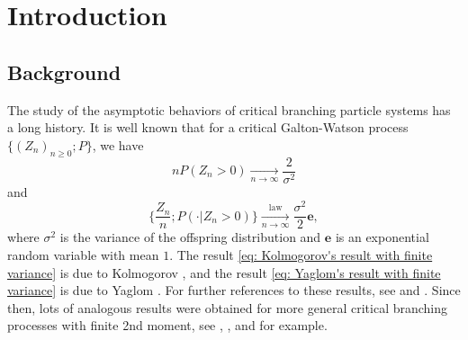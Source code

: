 \documentclass[12pt, a4paper]{amsart}
\theoremstyle{definition}
\numberwithin{equation}{section}
\begin{document}
\section{Introduction}

\subsection{Background}
	The study of the asymptotic behaviors of critical branching particle systems has a long history.
	It is well known that for a critical Galton-Watson process $\{(Z_n)_{n\geq 0}; P\}$, we have
\begin{equation}\label{eq: Kolmogorov's result with finite variance}
	n P(Z_n > 0)
	\xrightarrow[n\to \infty]{} \frac{2}{\sigma^2}
\end{equation}
	and
\begin{equation}\label{eq: Yaglom's result with finite variance}
	\Big\{ \frac{Z_n}{n}; P(\cdot| Z_n > 0) \Big\}
	\xrightarrow[n \to \infty]{\operatorname{law}} \frac{\sigma^2}{2} \mathbf e,
\end{equation}
	where $\sigma^2$ is the variance of the offspring distribution and $\mathbf e$ is an exponential random variable with mean $1$.
	The result \eqref{eq: Kolmogorov's result with finite variance} is due to Kolmogorov \cite{Kolmogorov1938Zur-losung}, and the result \eqref{eq: Yaglom's result with finite variance} is due to Yaglom \cite{Yaglom1947Certain}.
	For further references to these results, see \cite{Harris2002The-theory} and \cite{KestenNeySpitzer1966The-Galton-Watson}.
	Since then, lots of analogous results were obtained for more general critical branching processes with finite 2nd moment, see \cite{AsmussenHering1983Branching}, \cite{AthreyaNey1974Functionals}, \cite{AthreyaNey1972Branching} and \cite{JoffeSpitzer1967On-multitype} for example.
	
\end{document}
